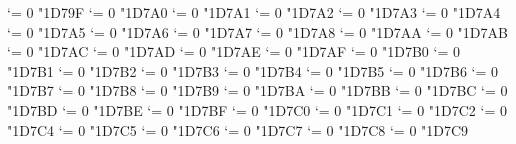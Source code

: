 {  \Umathcode `\Π = 0 \alphafam "1D79F
  \Umathcode `\Ρ = 0 \alphafam "1D7A0
  \Umathcode `\ϴ = 0 \alphafam "1D7A1
  \Umathcode `\Σ = 0 \alphafam "1D7A2
  \Umathcode `\Τ = 0 \alphafam "1D7A3
  \Umathcode `\Υ = 0 \alphafam "1D7A4
  \Umathcode `\Φ = 0 \alphafam "1D7A5
  \Umathcode `\Χ = 0 \alphafam "1D7A6
  \Umathcode `\Ψ = 0 \alphafam "1D7A7
  \Umathcode `\Ω = 0 \alphafam "1D7A8
  \Umathcode `\α = 0 \alphafam "1D7AA
  \Umathcode `\β = 0 \alphafam "1D7AB
  \Umathcode `\γ = 0 \alphafam "1D7AC
  \Umathcode `\δ = 0 \alphafam "1D7AD
  \Umathcode `\ε = 0 \alphafam "1D7AE
  \Umathcode `\ζ = 0 \alphafam "1D7AF
  \Umathcode `\η = 0 \alphafam "1D7B0
  \Umathcode `\θ = 0 \alphafam "1D7B1
  \Umathcode `\ι = 0 \alphafam "1D7B2
  \Umathcode `\κ = 0 \alphafam "1D7B3
  \Umathcode `\λ = 0 \alphafam "1D7B4
  \Umathcode `\μ = 0 \alphafam "1D7B5
  \Umathcode `\ν = 0 \alphafam "1D7B6
  \Umathcode `\ξ = 0 \alphafam "1D7B7
  \Umathcode `\ο = 0 \alphafam "1D7B8
  \Umathcode `\π = 0 \alphafam "1D7B9
  \Umathcode `\ρ = 0 \alphafam "1D7BA
  \Umathcode `\ς = 0 \alphafam "1D7BB
  \Umathcode `\σ = 0 \alphafam "1D7BC
  \Umathcode `\τ = 0 \alphafam "1D7BD
  \Umathcode `\υ = 0 \alphafam "1D7BE
  \Umathcode `\ϕ = 0 \alphafam "1D7BF
  \Umathcode `\χ = 0 \alphafam "1D7C0
  \Umathcode `\ψ = 0 \alphafam "1D7C1
  \Umathcode `\ω = 0 \alphafam "1D7C2
  \Umathcode `\ϵ = 0 \alphafam "1D7C4
  \Umathcode `\ϑ = 0 \alphafam "1D7C5
  \Umathcode `\ϰ = 0 \alphafam "1D7C6
  \Umathcode `\φ = 0 \alphafam "1D7C7
  \Umathcode `\ϱ = 0 \alphafam "1D7C8
  \Umathcode `\ϖ = 0 \alphafam "1D7C9
\fi
\tensfbfit}
\let\sfitbf=\sfbfit
\let\bfsfit=\sfbfit
\let\bfitsf=\sfbfit
\let\itsfbf=\sfbfit
\let\itbfsf=\sfbfit

